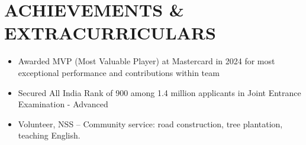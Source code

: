 \documentclass[letterpaper,10pt]{article}
\begin{document}
\section{ACHIEVEMENTS \& EXTRACURRICULARS}
    \begin{itemize}
        \setlength\itemsep{-0.5em}
        \item Awarded MVP (Most Valuable Player) at Mastercard in 2024 for most exceptional performance and contributions within team
        \item Secured All India Rank of 900 among 1.4 million applicants in Joint Entrance Examination - Advanced
        \item Volunteer, NSS – Community service: road construction, tree plantation, teaching English.
    \end{itemize}
\end{document}
